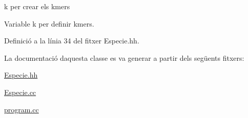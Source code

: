 k per crear els kmers 

Variable k per definir kmers. 

Definició a la línia 34 del fitxer Especie.\+hh.



La documentació d\textquotesingle{}aquesta classe es va generar a partir dels següents fitxers\+:\begin{DoxyCompactItemize}
\item 
\hyperlink{_especie_8hh}{Especie.\+hh}\item 
\hyperlink{_especie_8cc}{Especie.\+cc}\item 
\hyperlink{program_8cc}{program.\+cc}\end{DoxyCompactItemize}
